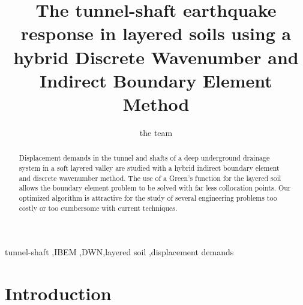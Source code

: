 \documentclass[preprint,5p,times]{elsarticle}
\begin{document}
\begin{frontmatter}
\title{The tunnel-shaft earthquake response in layered soils using a hybrid Discrete Wavenumber and Indirect Boundary Element Method}
\author{the team}

\begin{abstract}
Displacement demands in the tunnel and shafts of a deep underground drainage system in a soft layered valley are studied with a hybrid indirect boundary element and discrete wavenumber method. The use of a Green's function for the layered soil allows the boundary element problem to be solved with far less collocation points. Our optimized algorithm is attractive for the study of several engineering problems too costly or too cumbersome with current techniques. 
\end{abstract}
\begin{keyword}
tunnel-shaft \sep IBEM \sep DWN\sep layered soil \sep displacement demands
\end{keyword}
\end{frontmatter}
\section{Introduction}
\end{document}
